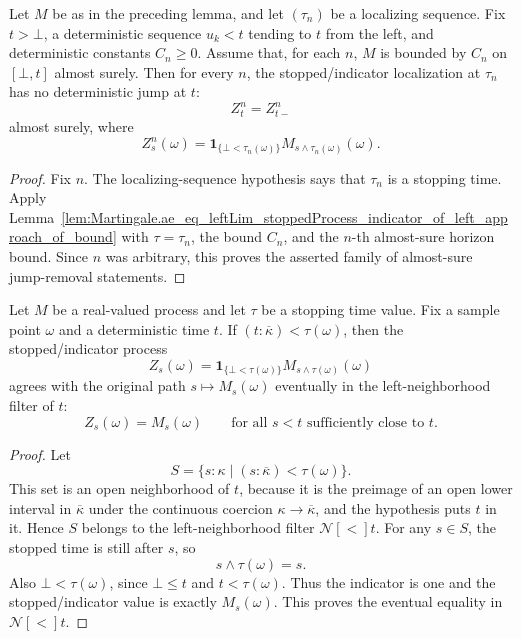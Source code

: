 \begin{lemma}\label{lem:Martingale.ae_eq_leftLim_localizingSequence_stoppedProcess_indicator_of_left_approach_of_bound}
Let \(M\) be as in the preceding lemma, and let \((\tau_n)\) be a localizing
sequence.  Fix \(t>\bot\), a deterministic sequence \(u_k<t\) tending to \(t\)
from the left, and deterministic constants \(C_n\ge0\).  Assume that, for
each \(n\), \(M\) is bounded by \(C_n\) on \([\bot,t]\) almost surely.  Then
for every \(n\), the stopped/indicator localization at \(\tau_n\) has no
deterministic jump at \(t\):
\[
  Z^n_t = Z^n_{t-}
\]
almost surely, where
\[
  Z^n_s(\omega)
  =
  \mathbf 1_{\{\bot<\tau_n(\omega)\}}
  M_{s\wedge\tau_n(\omega)}(\omega).
\]
\end{lemma}

\begin{proof}
Fix \(n\).  The localizing-sequence hypothesis says that \(\tau_n\) is a
stopping time.  Apply
Lemma~\ref{lem:Martingale.ae_eq_leftLim_stoppedProcess_indicator_of_left_approach_of_bound}
with \(\tau=\tau_n\), the bound \(C_n\), and the \(n\)-th almost-sure horizon
bound.  Since \(n\) was arbitrary, this proves the asserted family of
almost-sure jump-removal statements.
\end{proof}

\begin{lemma}\label{lem:stoppedProcess_indicator_eventuallyEq_left_of_lt}
Let \(M\) be a real-valued process and let \(\tau\) be a stopping time value.
Fix a sample point \(\omega\) and a deterministic time \(t\).  If
\((t:\overline{\kappa})<\tau(\omega)\), then the stopped/indicator process
\[
  Z_s(\omega)
  =
  \mathbf 1_{\{\bot<\tau(\omega)\}}M_{s\wedge\tau(\omega)}(\omega)
\]
agrees with the original path \(s\mapsto M_s(\omega)\) eventually in the
left-neighborhood filter of \(t\):
\[
  Z_s(\omega)=M_s(\omega)
  \qquad\text{for all \(s<t\) sufficiently close to \(t\).}
\]
\end{lemma}

\begin{proof}
Let
\[
  S=\{s:\kappa\mid (s:\overline{\kappa})<\tau(\omega)\}.
\]
This set is an open neighborhood of \(t\), because it is the preimage of an
open lower interval in \(\overline{\kappa}\) under the continuous coercion
\(\kappa\to\overline{\kappa}\), and the hypothesis puts \(t\) in it.  Hence
\(S\) belongs to the left-neighborhood filter \(\mathcal N[<]t\).  For any
\(s\in S\), the stopped time is still after \(s\), so
\[
  s\wedge\tau(\omega)=s .
\]
Also \(\bot<\tau(\omega)\), since \(\bot\le t\) and \(t<\tau(\omega)\).
Thus the indicator is one and the stopped/indicator value is exactly
\(M_s(\omega)\).  This proves the eventual equality in
\(\mathcal N[<]t\).
\end{proof}

